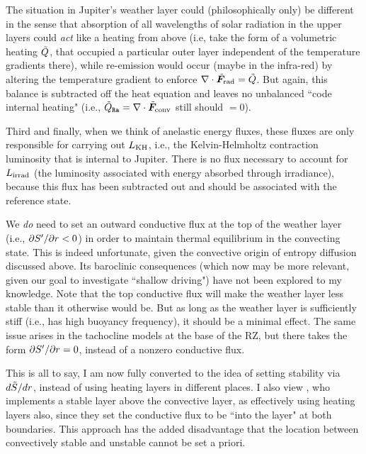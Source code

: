 \documentclass[12pt]{article}
\numberwithin{equation}{section}
\newcommand{\lumirrad}{L_{\rm irrad}}
\newcommand{\lumkh}{L_{\rm KH}}
\begin{document}
The situation in Jupiter's weather layer could (philosophically only) be different in the sense that absorption of all wavelengths of solar radiation in the upper layers could \textit{act} like a heating from above (i.e, take the form of a volumetric heating $\tilde{Q}$, that occupied a particular outer layer independent of the temperature gradients there), while re-emission would occur (maybe in the infra-red) by altering the temperature gradient to enforce $\nabla\cdot\tilde{\bm{F}}_{\rm rad}=\tilde{Q}$. But again, this balance is subtracted off the heat equation and leaves no unbalanced ``code internal heating" (i.e., $\tilde{Q}_{\texttt{Ra}}=\nabla\cdot\tilde{\bm{F}}_{\rm conv}$ still should $=0$).  %

Third and finally, when we think of anelastic energy fluxes, these fluxes are only responsible for carrying out $\lumkh$, i.e., the Kelvin-Helmholtz contraction luminosity that is internal to Jupiter. There is no flux necessary to account for $\lumirrad$ (the luminosity associated with energy absorbed through irradiance), because this flux has been subtracted out and should be associated with the reference state. 

We \textit{do} need to set an outward conductive flux at the top of the weather layer (i.e., $\partial{S^\prime}/\partial r<0$) in order to maintain thermal equilibrium in the convecting state. This is indeed unfortunate, given the convective origin of entropy diffusion discussed above. Its baroclinic consequences (which now may be more relevant, given our goal to investigate ``shallow driving") have not been explored to my knowledge. Note that the top conductive flux will make the weather layer less stable than it otherwise would be. But as long as the weather layer is sufficiently stiff (i.e., has high buoyancy frequency), it should be a minimal effect. The same issue arises in the tachocline models at the base of the RZ, but there takes the form $\partial{S^\prime}/\partial r=0$, instead of a nonzero conductive flux. 

This is all to say, I am now fully converted to the idea of setting stability via $d\tilde{S}/dr$, instead of using heating layers in different places. I also view \citet{Heimpel2022}, who implements a stable layer above the convective layer, as effectively using heating layers also, since they set the conductive flux to be ``into the layer" at both boundaries. This approach has the added disadvantage that the location between convectively stable and unstable cannot be set a priori. 
\end{document}
